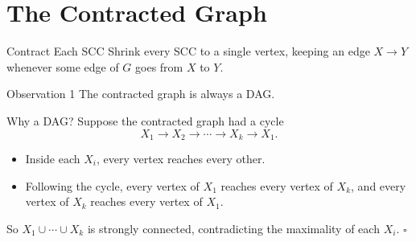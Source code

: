 \documentclass[10pt,aspectratio=169]{beamer}
\begin{document}
\section{The Contracted Graph}

\begin{frame}{Contract Each SCC}
  Shrink every SCC to a single vertex, keeping an edge $X \to Y$ whenever some
  edge of $G$ goes from $X$ to $Y$.

  \bigskip
  \begin{center}
  \end{center}

  \pause
  \bigskip
  \begin{block}{Observation 1}
    The contracted graph is always a \alert{DAG}.
  \end{block}
\end{frame}

\begin{frame}{Why a DAG?}
  Suppose the contracted graph had a cycle
  \[
    X_1 \to X_2 \to \cdots \to X_k \to X_1 .
  \]

  \pause
  \begin{itemize}
    \item Inside each $X_i$, every vertex reaches every other.
    \item Following the cycle, every vertex of $X_1$ reaches every vertex of
          $X_k$, and every vertex of $X_k$ reaches every vertex of $X_1$.
  \end{itemize}

  \pause
  \bigskip
  So $X_1 \cup \cdots \cup X_k$ is strongly connected, contradicting the
  \alert{maximality} of each $X_i$. $\square$
\end{frame}
\end{document}
